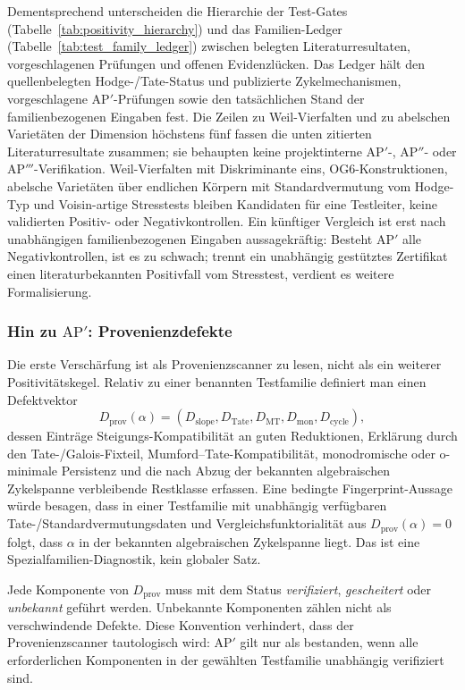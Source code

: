 \documentclass[aps,prd,twocolumn,superscriptaddress,nofootinbib]{revtex4-2}
\theoremstyle{definition}
\theoremstyle{remark}
\begin{document}
Dementsprechend unterscheiden die Hierarchie der Test-Gates (Tabelle~\ref{tab:positivity_hierarchy}) und das Familien-Ledger (Tabelle~\ref{tab:test_family_ledger}) zwischen belegten Literaturresultaten, vorgeschlagenen Prüfungen und offenen Evidenzlücken. Das Ledger hält den quellenbelegten Hodge-/Tate-Status und publizierte Zykelmechanismen, vorgeschlagene $\mathrm{AP}'$-Prüfungen sowie den tatsächlichen Stand der familienbezogenen Eingaben fest. Die Zeilen zu Weil-Vierfalten und zu abelschen Varietäten der Dimension höchstens fünf fassen die unten zitierten Literaturresultate zusammen; sie behaupten keine projektinterne $\mathrm{AP}'$-, $\mathrm{AP}''$- oder $\mathrm{AP}'''$-Verifikation. Weil-Vierfalten mit Diskriminante eins, OG6-Konstruktionen, abelsche Varietäten über endlichen Körpern mit Standardvermutung vom Hodge-Typ und Voisin-artige Stresstests bleiben Kandidaten für eine Testleiter, keine validierten Positiv- oder Negativkontrollen. Ein künftiger Vergleich ist erst nach unabhängigen familienbezogenen Eingaben aussagekräftig: Besteht $\mathrm{AP}'$ alle Negativkontrollen, ist es zu schwach; trennt ein unabhängig gestütztes Zertifikat einen literaturbekannten Positivfall vom Stresstest, verdient es weitere Formalisierung.

\subsubsection*{Hin zu \texorpdfstring{$\mathrm{AP}'$}{AP'}: Provenienzdefekte}
\label{subsec:provenance-defects}

Die erste Verschärfung ist als Provenienzscanner zu lesen, nicht als ein
weiterer Positivitätskegel. Relativ zu einer benannten Testfamilie definiert
man einen Defektvektor
\[
D_{\mathrm{prov}}(\alpha)
  = (D_{\mathrm{slope}},D_{\mathrm{Tate}},D_{\mathrm{MT}},
     D_{\mathrm{mon}},D_{\mathrm{cycle}}),
\]
dessen Einträge Steigungs-Kompatibilität an guten Reduktionen, Erklärung
durch den Tate-/Galois-Fixteil, Mumford--Tate-Kompatibilität,
monodromische oder o-minimale Persistenz und die nach Abzug der bekannten
algebraischen Zykelspanne verbleibende Restklasse erfassen. Eine bedingte
Fingerprint-Aussage würde besagen, dass in einer Testfamilie mit unabhängig
verfügbaren Tate-/Standardvermutungsdaten und Vergleichsfunktorialität aus
$D_{\mathrm{prov}}(\alpha)=0$ folgt, dass $\alpha$ in der bekannten
algebraischen Zykelspanne liegt. Das ist eine Spezialfamilien-Diagnostik,
kein globaler Satz.

Jede Komponente von $D_{\mathrm{prov}}$ muss mit dem Status
\emph{verifiziert}, \emph{gescheitert} oder \emph{unbekannt} geführt
werden. Unbekannte Komponenten zählen nicht als verschwindende Defekte.
Diese Konvention verhindert, dass der Provenienzscanner tautologisch wird:
$\mathrm{AP}'$ gilt nur als bestanden, wenn alle erforderlichen Komponenten in
der gewählten Testfamilie unabhängig verifiziert sind.
\end{document}
